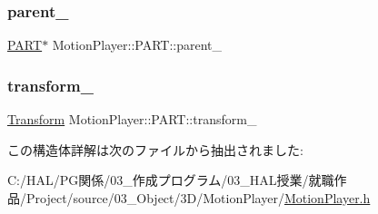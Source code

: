 \subsubsection{\texorpdfstring{parent\+\_\+}{parent\_}}
{\footnotesize\ttfamily \mbox{\hyperlink{struct_motion_player_1_1_p_a_r_t}{P\+A\+RT}}$\ast$ Motion\+Player\+::\+P\+A\+R\+T\+::parent\+\_\+}

\mbox{\label{struct_motion_player_1_1_p_a_r_t_a6f63db94daff421428a6ad093111162f}} 
\subsubsection{\texorpdfstring{transform\+\_\+}{transform\_}}
{\footnotesize\ttfamily \mbox{\hyperlink{class_transform}{Transform}} Motion\+Player\+::\+P\+A\+R\+T\+::transform\+\_\+}



この構造体詳解は次のファイルから抽出されました\+:\begin{DoxyCompactItemize}
\item 
C\+:/\+H\+A\+L/\+P\+G関係/03\+\_\+作成プログラム/03\+\_\+\+H\+A\+L授業/就職作品/\+Project/source/03\+\_\+\+Object/3\+D/\+Motion\+Player/\mbox{\hyperlink{_motion_player_8h}{Motion\+Player.\+h}}\end{DoxyCompactItemize}
